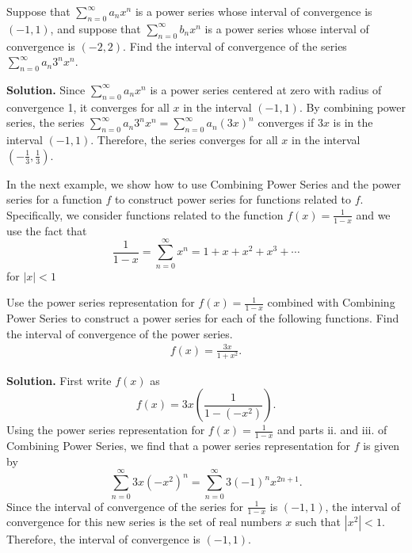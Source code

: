 \documentclass{report}
\begin{document}
    \bigbreak \noindent 
    \begin{eg}
        Suppose that \(\sum_{n=0}^{\infty} a_n x^n\) is a power series whose interval of convergence is \((-1, 1)\), and suppose that \(\sum_{n=0}^{\infty} b_n x^n\) is a power series whose interval of convergence is \((-2, 2)\).
        \bigbreak \noindent 
        Find the interval of convergence of the series \(\sum_{n=0}^{\infty} a_n 3^n x^n\).
    \end{eg}
    \bigbreak \noindent 
    \textbf{Solution.} Since \(\sum_{n=0}^{\infty} a_n x^n\) is a power series centered at zero with radius of convergence 1, it converges for all \(x\) in the interval \((-1, 1)\). By combining power series, the series \(\sum_{n=0}^{\infty} a_n 3^n x^n = \sum_{n=0}^{\infty} a_n (3x)^n\) converges if \(3x\) is in the interval \((-1, 1)\). Therefore, the series converges for all \(x\) in the interval \(\left(-\frac{1}{3}, \frac{1}{3}\right)\).

    \pagebreak \bigbreak \noindent 
    In the next example, we show how to use Combining Power Series and the power series for a function \( f \) to construct power series for functions related to \( f \). Specifically, we consider functions related to the function \( f(x) = \frac{1}{1 - x} \) and we use the fact that
    \[
    \frac{1}{1 - x} = \sum_{n=0}^{\infty} x^n = 1 + x + x^2 + x^3 + \cdots
    \]
    for \( |x| < 1 \)

    \bigbreak \noindent 
    \begin{eg}
        Use the power series representation for \( f(x) = \frac{1}{1 - x} \) combined with Combining Power Series to construct a power series for each of the following functions. Find the interval of convergence of the power series.
        \begin{align*}
            f(x) = \frac{3x}{1+x^{2}}
        .\end{align*}
        
    \end{eg}
    \bigbreak \noindent 
    \textbf{Solution.} First write \( f(x) \) as
    \[ f(x) = 3x \left( \frac{1}{1 - (-x^2)} \right). \]
    Using the power series representation for \( f(x) = \frac{1}{1 - x} \) and parts ii. and iii. of Combining Power Series, we find that a power series representation for \( f \) is given by
    \[ \sum_{n=0}^{\infty} 3x(-x^2)^n = \sum_{n=0}^{\infty} 3(-1)^n x^{2n+1}. \]
    Since the interval of convergence of the series for \( \frac{1}{1 - x} \) is \((-1, 1)\), the interval of convergence for this new series is the set of real numbers \( x \) such that \( |x^2| < 1 \). Therefore, the interval of convergence is \((-1, 1)\).
\end{document}
